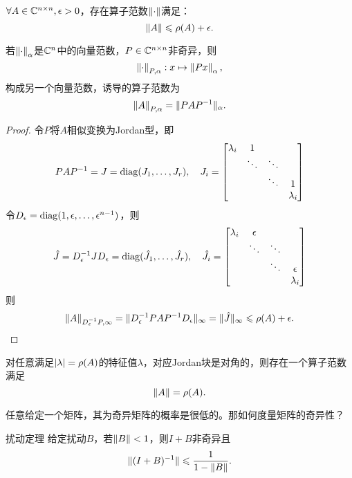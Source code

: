 \begin{theorem}
    {}{}
    $\forall A\in\mathbb C^{n\times n},\epsilon>0$，存在算子范数$\left\lVert\cdot\right\rVert$满足：
    \begin{equation}
        \left\lVert A\right\rVert\leqslant\rho(A)+\epsilon.
    \end{equation}
\end{theorem}

\begin{lemma}
    若$\left\lVert\cdot\right\rVert_\alpha$是$\mathbb C^n$中的向量范数，$P\in\mathbb C^{n\times n}$非奇异，则
    \[
        \left\lVert\cdot\right\rVert_{P,\alpha}:x\mapsto\left\lVert Px\right\rVert_\alpha,
    \]
    构成另一个向量范数，诱导的算子范数为
    \[
        \left\lVert A\right\rVert_{P,\alpha}=\lVert PAP^{-1}\rVert_\alpha.
    \]
\end{lemma}

\begin{proof}
    令$P$将$A$相似变换为Jordan型，即
    \[
        PAP^{-1}=J=\operatorname{diag}(J_1,\ldots,J_r),\quad J_i=\begin{bmatrix}
            \lambda_i&1\\
            &\ddots&\ddots\\
            &&\ddots&1\\
            &&&\lambda_i
        \end{bmatrix}
    \]
    令$D_\epsilon=\operatorname{diag}(1,\epsilon,\ldots,\epsilon^{n-1})$，则 
    \[
        \hat J=D_\epsilon^{-1} JD_\epsilon=\operatorname{diag}(\hat J_1,\ldots,\hat J_r),\quad\hat J_i=\begin{bmatrix}
            \lambda_i&\epsilon\\
            &\ddots&\ddots\\
            &&\ddots&\epsilon\\
            &&&\lambda_i
        \end{bmatrix}
    \]
    则
    \[
        \left\lVert A\right\rVert_{D_\epsilon^{-1} P,\infty}=\lVert D_\epsilon^{-1} PAP^{-1} D_\epsilon\rVert_\infty=\lVert\hat J\rVert_\infty\leqslant\rho(A)+\epsilon.
        \qedhere
    \]
\end{proof}

\begin{remark}
    对任意满足$\left\lvert\lambda\right\rvert=\rho(A)$的特征值$\lambda$，对应Jordan块是对角的，则存在一个算子范数满足
    \[
        \left\lVert A\right\rVert=\rho(A).
    \]
\end{remark}

任意给定一个矩阵，其为奇异矩阵的概率是很低的。那如何度量矩阵的奇异性？%

\begin{theorem}
    {扰动定理}{}
    给定扰动$B$，若$\left\lVert B\right\rVert<1$，则$I+B$非奇异且
    \begin{equation}
        \lVert(I+B)^{-1}\rVert\leqslant\frac1{1-\left\lVert B\right\rVert}.
    \end{equation}
\end{theorem}

